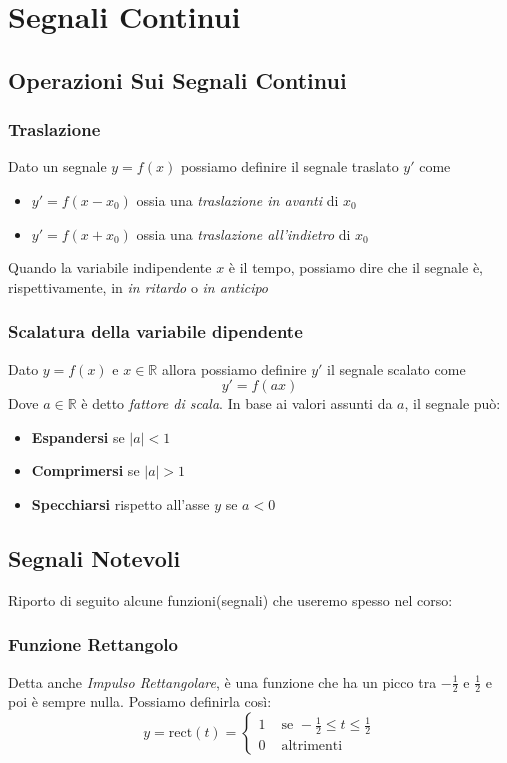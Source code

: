 \section{Segnali Continui}
\subsection{Operazioni Sui Segnali Continui}
\subsubsection{Traslazione}
Dato un segnale $y = f(x)$ possiamo definire il segnale traslato $y'$ come
\begin{itemize}
    \item $y' = f(x - x_0)$ ossia una \textit{traslazione in avanti} di $x_0$
    \item $y' = f(x + x_0)$ ossia una \textit{traslazione all'indietro} di $x_0$
\end{itemize}
Quando la variabile indipendente $x$ è il tempo, possiamo dire che il segnale è, rispettivamente, in \textit{in ritardo} o \textit{in anticipo}

\subsubsection{Scalatura della variabile dipendente}
Dato $y = f(x)$ e $x \in \mathbb{R}$ allora possiamo definire $y'$ il segnale scalato come
\begin{equation*}
    y' = f(ax)
\end{equation*}
Dove $a \in \mathbb{R}$ è detto \textit{fattore di scala}.
In base ai valori assunti da $a$, il segnale può:
\begin{itemize}
    \item \textbf{Espandersi} se $|a| < 1$
    \item \textbf{Comprimersi} se $|a| > 1$
    \item \textbf{Specchiarsi} rispetto all'asse $y$ se $a < 0$ 
\end{itemize} 

\newpage
\subsection{Segnali Notevoli}
Riporto di seguito alcune funzioni(segnali) che useremo spesso nel corso:

\subsubsection{Funzione Rettangolo}
Detta anche \textit{Impulso Rettangolare}, è una funzione che ha un picco tra $-\frac{1}{2}$ e $\frac{1}{2}$ e poi è sempre nulla.
Possiamo definirla così:
\begin{equation}
    y = \mbox{rect}(t) = \begin{cases}
        1 & \mbox{ se } -\frac{1}{2} \leq t \leq \frac{1}{2}\\
        0 & \mbox{ altrimenti} 
    \end{cases}
\end{equation}
